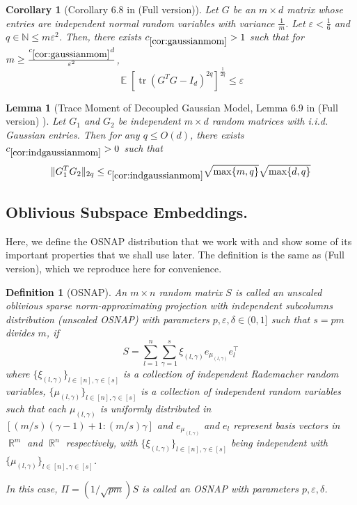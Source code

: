 \documentclass[11pt]{amsart}
\numberwithin{equation}{section}
\numberwithin{equation}{section}
\DeclareMathOperator{\E}{\mathbb{E}}
\DeclareMathOperator{\R}{\mathbb{R}}
\DeclareMathOperator*{\tr}{tr}
\DeclarePairedDelimiter{\norm}{\lVert}{\rVert}
\newtheorem{corollary}[theorem]{Corollary}
\newtheorem{lemma}[theorem]{Lemma}
\newtheorem{definition}[theorem]{Definition}
\begin{document}
\begin{corollary}[Corollary 6.8  in \cite{chenakkod2025optimal} (Full version)] \label{cor:gaussianmom}
    Let $G$ be an $m \times d$ matrix whose entries are independent normal random variables with variance $\frac{1}{m}$. Let $\varepsilon<\frac{1}{6}$ and $q \in \mathbb{N} \le m \varepsilon^2 $. Then, there exists $c_{\ref*{cor:gaussianmom}} > 1$ such that for $m \geq \frac{c_{\ref*{cor:gaussianmom}}d}{\varepsilon^2}$,
    \[ \E[\tr(G^TG - I_d)^{2q}]^\frac{1}{2q} \leq  \varepsilon \]
    
\end{corollary}





\begin{lemma}[Trace Moment of Decoupled Gaussian Model, Lemma 6.9  in \cite{chenakkod2025optimal} (Full version) ]\label{cor:indgaussianmom}
    Let $G_1$ and $G_2$ be independent $m \times d$ random matrices with i.i.d. Gaussian entries. Then for any $q \le O(d)$, there exists $c_{\ref*{cor:indgaussianmom}}>0$ such that 
    \[ \norm{G_1^TG_2}_{2q} \le c_{\ref{cor:indgaussianmom}}\sqrt{\max\{m,q\}}\sqrt{\max\{d,q\}}\]
    
\end{lemma}



\subsection{Oblivious Subspace Embeddings.} \label{subsec:osnapprops}

Here, we define the OSNAP distribution that we work with and show some of its important properties that we shall use later. The definition is the same as \cite{chenakkod2025optimal} (Full version), which we reproduce here for convenience.

 \begin{definition}[OSNAP]\label{def:osnap} 
 An $m \times n$ random matrix $S$ is called an unscaled oblivious sparse norm-approximating projection with independent subcolumns distribution (unscaled OSNAP)
  with parameters $p, \varepsilon, \delta \in (0,1]$ such that $s=pm$ divides $m$, if 
 \[ S = \sum_{l=1}^n \sum_{\gamma=1}^s \xi_{(l,\gamma)} e_{\mu_{(l, \gamma)}} e_l ^\top \]
 where $\{ \xi_{(l,\gamma)} \}_{l \in [n], \gamma \in [s]}$ is a collection of independent Rademacher random variables, $\{ \mu_{(l,\gamma)} \}_{l \in [n], \gamma \in [s]}$ is a collection of independent random variables such that each $\mu_{(l,\gamma)}$ is uniformly distributed in $[(m/s)(\gamma-1)+1:(m/s)\gamma]$ and $e_{\mu_{(l, \gamma)}}$ and $e_l$ represent basis vectors in $\R^m$ and $\R^n$ respectively, with $\{ \xi_{(l,\gamma)} \}_{l \in [n], \gamma \in [s]}$ being independent with $\{ \mu_{(l,\gamma)} \}_{l \in [n], \gamma \in [s]}$.

 In this case, $\Pi = (1/\sqrt{pm})S$ is called an OSNAP with parameters $p, \varepsilon, \delta$. 
 \end{definition}
\end{document}
